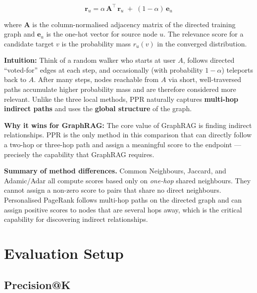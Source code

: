 \documentclass[10pt]{article}
\begin{document}
\begin{equation}
  \mathbf{r}_u = \alpha\, \mathbf{A}^\top\, \mathbf{r}_u \;+\; (1 - \alpha)\, \mathbf{e}_u
  \label{eq:ppr}
\end{equation}

\noindent where $\mathbf{A}$ is the column-normalised adjacency matrix of the directed training graph and $\mathbf{e}_u$ is the one-hot vector for source node $u$. The relevance score for a candidate target $v$ is the probability mass $r_u(v)$ in the converged distribution.

\noindent\textbf{Intuition:} Think of a random walker who starts at user $A$, follows directed ``voted-for'' edges at each step, and occasionally (with probability $1-\alpha$) teleports back to $A$. After many steps, nodes reachable from $A$ via short, well-traversed paths accumulate higher probability mass and are therefore considered more relevant. Unlike the three local methods, PPR naturally captures \textbf{multi-hop indirect paths} and uses the \textbf{global structure} of the graph.

\noindent\textbf{Why it wins for GraphRAG:} The core value of GraphRAG is finding indirect relationships. PPR is the only method in this comparison that can directly follow a two-hop or three-hop path and assign a meaningful score to the endpoint --- precisely the capability that GraphRAG requires.

\begin{callout}
\textbf{Summary of method differences.} Common Neighbours, Jaccard, and Adamic/Adar all compute scores based only on \emph{one-hop} shared neighbours. They cannot assign a non-zero score to pairs that share no direct neighbours. Personalised PageRank follows multi-hop paths on the directed graph and can assign positive scores to nodes that are several hops away, which is the critical capability for discovering indirect relationships.
\end{callout}

\section{Evaluation Setup}
\label{sec:evaluation}

\subsection{Precision@K}
\end{document}
